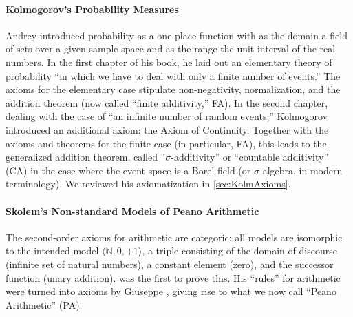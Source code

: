 \paragraph{Kolmogorov's Probability Measures}\label{sec:Kolmogorov}
Andrey \citet{Kolmogorov:1933} introduced probability as a one-place function with as the domain a field of sets over a given sample space and as the range the unit interval of the real numbers. In the first chapter of his book, he laid out an elementary theory of probability ``in which we have to deal with only a finite number of events.'' The axioms for the elementary case stipulate non-negativity, normalization, and the addition theorem (now called ``finite additivity,'' FA).
In the second chapter, dealing with the case of ``an infinite number of random events,'' Kolmogorov introduced an additional axiom: the Axiom of Continuity. Together with the axioms and theorems for the finite case (in particular, FA), this leads to the generalized addition theorem, called ``$\sigma $-additivity'' or ``countable additivity'' (CA) in the case where the event space is a Borel field (or $\sigma $-algebra, in modern terminology). We reviewed his axiomatization in \autoref{sec:KolmAxioms}.

\paragraph{Skolem's Non-standard Models of Peano Arithmetic}\label{sec:skolem}
The second-order axioms for arithmetic are categoric: all models are isomorphic to the intended model $\langle \mathbb{N},0,+1 \rangle$, a triple consisting of the domain of discourse (infinite set of natural numbers), a constant element (zero), and the successor function (unary addition).
\citet{Dedekind:1888} was the first to prove this. His ``rules'' for arithmetic were turned into axioms by Giuseppe \citet{Peano:1889}, giving rise to what we now call ``Peano Arithmetic'' (PA).

